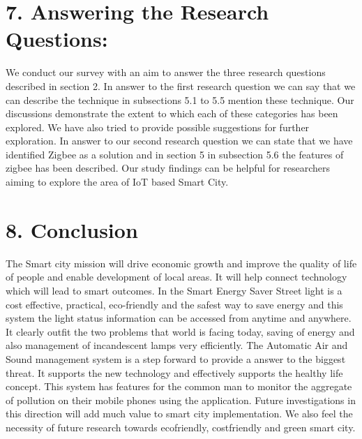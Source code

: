 \documentclass[a4paper]{report}
\begin{document}
	\section*{7. Answering the Research Questions:}
	We conduct our survey with an aim to answer the three research questions described in section 2. In answer to the first research question we can say that we can describe the technique in subsections 5.1 to 5.5 mention these
	technique. Our discussions demonstrate the extent to which each of these categories has been explored. We have also tried to provide possible suggestions for further exploration.
	In answer to our second research question we can state that we have identified Zigbee as a solution and in section 5 in subsection 5.6 the features of zigbee has been described. Our study findings can be helpful for
	researchers aiming to explore the area of IoT based Smart City.
	
	
	\section*{8. Conclusion}
	The Smart city mission will drive economic growth and improve the quality of life of people and enable
	development of local areas. It will help connect technology which will lead to smart outcomes.
	In the Smart Energy Saver Street light is a cost effective, practical, eco-friendly and the safest way to save energy
	and this system the light status information can be accessed from anytime and anywhere. It clearly outfit the two
	problems that world is facing today, saving of energy and also management of incandescent lamps very
	efficiently.
	The Automatic Air and Sound management system is a step forward to provide a answer to the biggest threat. It
	supports the new technology and effectively supports the healthy life concept. This system has features for the
	common man to monitor the aggregate of pollution on their mobile phones using the application. Future investigations in this direction will add much value to smart city implementation.
	We also feel the necessity of future research towards ecofriendly, costfriendly and green smart city.
	
	\newpage
	
\end{document}
